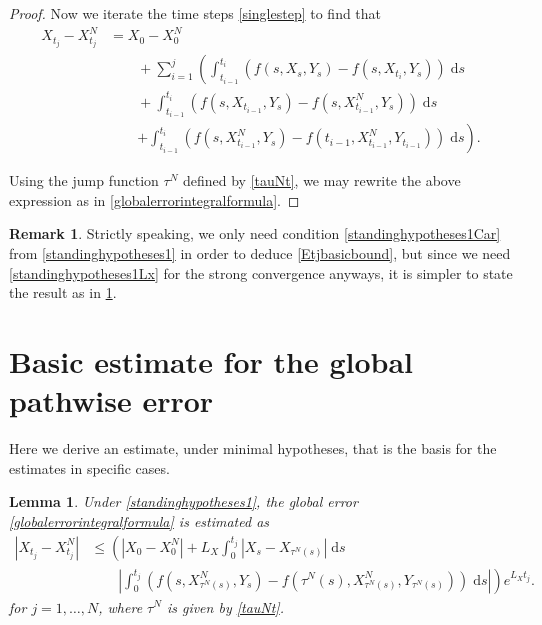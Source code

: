 \documentclass[reqno,12pt]{amsart}
\theoremstyle{plain}%
\newtheorem{lem}{Lemma}[section]
\theoremstyle{definition}
\newtheorem{rmk}{Remark}[section]
\begin{document}
\begin{proof}
    Now we iterate the time steps \eqref{singlestep} to find that
    \begin{align*}
        X_{t_j} - X_{t_j}^N & = X_0 - X_0^N \\
        & \qquad + \sum_{i=1}^{j} \left(\int_{t_{i-1}}^{t_i} \left( f(s, X_s, Y_s) - f(s, X_{t_{i}}, Y_s) \right)\;\mathrm{d}s \right. \\ 
        & \qquad + \int_{t_{i-1}}^{t_i} \left( f(s, X_{t_{i-1}}, Y_s) - f(s, X_{t_{i-1}}^N, Y_s) \right)\;\mathrm{d}s \\
        & \qquad \left. + \int_{t_{i-1}}^{t_i} \left( f(s, X_{t_{i-1}}^N, Y_s) - f(t_{i-1}, X_{t_{i-1}}^N, Y_{t_{i-1}}) \right)\;\mathrm{d}s \right).
    \end{align*}

    Using the jump function $\tau^N$ defined by \eqref{tauNt}, we may rewrite the above expression as in \eqref{globalerrorintegralformula}.
\end{proof}

\begin{rmk}
    Strictly speaking, we only need condition \eqref{standinghypotheses1Car} from \cref{standinghypotheses1} in order to deduce \eqref{Etjbasicbound}, but since we need \eqref{standinghypotheses1Lx} for the strong convergence anyways, it is simpler to state the result as in \cref{lembasicestimate}.
\end{rmk}

\section{Basic estimate for the global pathwise error}

Here we derive an estimate, under minimal hypotheses, that is the basis for the estimates in specific cases.

\begin{lem}
    \label{lembasicestimate}
    Under \cref{standinghypotheses1}, the global error \eqref{globalerrorintegralformula} is estimated as
    \begin{equation}
        \label{Etjbasicbound}
        \begin{aligned}
            |X_{t_j} - X_{t_j}^N| & \leq \left( |X_0 - X_0^N| + L_X \int_0^{t_j} |X_s - X_{\tau^N(s)}| \;\mathrm{d}s \right. \\
            & \qquad \left. \left|\int_0^{t_j} \left( f(s, X_{\tau^N(s)}^N, Y_s) - f(\tau^N(s), X_{\tau^N(s)}^N, Y_{\tau^N(s)}) \right)\;\mathrm{d}s\right|\right) e^{L_X t_j}.
        \end{aligned}
    \end{equation}
    for $j=1, \ldots, N$, where $\tau^N$ is given by \eqref{tauNt}.
\end{lem}
\end{document}
